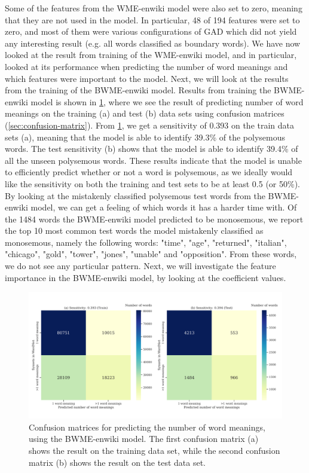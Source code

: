 Some of the features from the WME-enwiki model were also set to zero, meaning that they are not used in the model. In particular, 48 of 194 features were set to zero, and most of them were various configurations of GAD which did not yield any interesting result (e.g. all words classified as boundary words). We have now looked at the result from training of the WME-enwiki model, and in particular, looked at its performance when predicting the number of word meanings and which features were important to the model. Next, we will look at the results from the training of the BWME-enwiki model. Results from training the BWME-enwiki model is shown in \cref{fig:bwme-enwiki-confusion-matrices}, where we see the result of predicting number of word meanings on the training (a) and test (b) data sets using confusion matrices (\cref{sec:confusion-matrix}). From \cref{fig:bwme-enwiki-confusion-matrices}, we get a sensitivity of 0.393 on the train data sets (a), meaning that the model is able to identify 39.3\% of the polysemous words. The test sensitivity (b) shows that the model is able to identify 39.4\% of all the unseen polysemous words. These results indicate that the model is unable to efficiently predict whether or not a word is polysemous, as we ideally would like the sensitivity on both the training and test sets to be at least 0.5 (or 50\%). By looking at the mistakenly classified polysemous test words from the BWME-enwiki model, we can get a feeling of which words it has a harder time with. Of the 1484 words the BWME-enwiki model predicted to be monosemous, we report the top 10 most common test words the model mistakenly classified as monosemous, namely the following words: "time", "age", "returned", "italian", "chicago", "gold", "tower", "jones", "unable" and "opposition". From these words, we do not see any particular pattern. Next, we will investigate the feature importance in the BWME-enwiki model, by looking at the coefficient values.
\begin{figure}[H]
    \centering
    \includegraphics[width=\textwidth]{thesis/figures/bwme-enwiki-confusion-matrices.pdf}
    \caption{Confusion matrices for predicting the number of word meanings, using the BWME-enwiki model. The first confusion matrix (a) shows the result on the training data set, while the second confusion matrix (b) shows the result on the test data set.}
    \label{fig:bwme-enwiki-confusion-matrices}
\end{figure}

